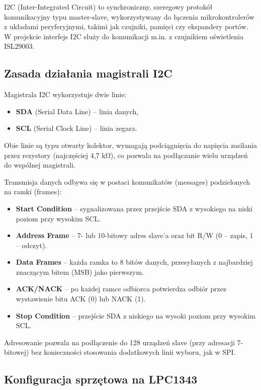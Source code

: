 \documentclass[a4paper,12pt]{report}
\begin{document}
I2C (Inter-Integrated Circuit) to synchroniczny, szeregowy protokół komunikacyjny typu master-slave, wykorzystywany do łączenia mikrokontrolerów z układami peryferyjnymi, takimi jak czujniki, pamięci czy ekspandery portów. W projekcie interfejs I2C służy do komunikacji m.in. z czujnikiem oświetlenia ISL29003.

\subsection*{Zasada działania magistrali I2C}

Magistrala I2C wykorzystuje dwie linie:
\begin{itemize}
    \item \textbf{SDA} (Serial Data Line) – linia danych,
    \item \textbf{SCL} (Serial Clock Line) – linia zegara.
\end{itemize}
Obie linie są typu otwarty kolektor, wymagają podciągnięcia do napięcia zasilania przez rezystory (najczęściej 4,7 k\si{\ohm}), co pozwala na podłączanie wielu urządzeń do wspólnej magistrali.

Transmisja danych odbywa się w postaci komunikatów (messages) podzielonych na ramki (frames):
\begin{itemize}
    \item \textbf{Start Condition} – sygnalizowana przez przejście SDA z wysokiego na niski poziom przy wysokim SCL.
    \item \textbf{Address Frame} – 7- lub 10-bitowy adres slave’a oraz bit R/W (0 – zapis, 1 – odczyt).
    \item \textbf{Data Frames} – każda ramka to 8 bitów danych, przesyłanych z najbardziej znaczącym bitem (MSB) jako pierwszym.
    \item \textbf{ACK/NACK} – po każdej ramce odbiorca potwierdza odbiór przez wystawienie bitu ACK (0) lub NACK (1).
    \item \textbf{Stop Condition} – przejście SDA z niskiego na wysoki poziom przy wysokim SCL.
\end{itemize}

Adresowanie pozwala na podłączenie do 128 urządzeń slave (przy adresacji 7-bitowej) bez konieczności stosowania dodatkowych linii wyboru, jak w SPI.

\subsection*{Konfiguracja sprzętowa na LPC1343}
\end{document}
